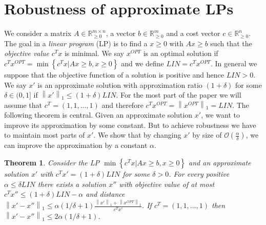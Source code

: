 \documentclass[a4paper,11pt]{article}
\newcommand{\menge}[1]{\left\{#1\right\}}
\newcommand{\nor}[1]{\left\|#1\right\|}
\newtheorem{thm}{Theorem}
\begin{document}
\section{Robustness of approximate LPs}
We consider a matrix $A \in \mathbb{R}_{\geq 0}^{m\times n}$, a vector $b \in \mathbb{R}_{\geq0}^{m}$ and a cost vector
$c\in \mathbb{R}_{\geq0}^{n}$.
The goal in a \emph{linear program} (LP) is to find a $x\geq0$ with $Ax \geq b$ such that the
\emph{objective value} $c^T x$ is minimal.
We say $x^\mathit{OPT}$ is an optimal solution if $c^T x^\mathit{OPT} = \min \menge{c^T x | Ax \geq b, x \geq 0 }$ 
and we define $\mathit{LIN} = c^T x^\mathit{OPT}$. In general we suppose that the objective function of a solution
is positive and hence $\mathit{LIN} >0$.
We say $x'$ is an approximate solution with approximation ratio $(1+\delta)$ for some 
$\delta \in (0,1]$ if $\nor{x'}_1 \leq (1+\delta)\mathit{LIN}$. For the most part of the paper we will assume that
$c^T = (1,1, \ldots ,1)$ and therefore $c^T x^{\mathit{OPT}} = \nor{x^{\mathit{OPT}}}_1 = \mathit{LIN}$.
The following theorem is central. Given an approximate solution $x'$, we want to improve its
approximation by some constant. But to achieve robustness we have to maintain most
parts of $x'$. We show that by changing $x'$ by size of $\mathcal{O}(\frac{\alpha}{\delta})$, 
we can improve the approximation by a constant $\alpha$.
\begin{thm}
  \label{thm1}
  Consider the LP $\min \menge{c^T x | Ax \geq b, x
  \geq 0 }$ and an approximate solution $x'$ with $c^T x'
  = (1 + \delta) \mathit{LIN}$ for some $\delta >0$.  For every positive $\alpha \leq \delta \mathit{LIN}$ there 
  exists a solution $x''$ with objective value of at most $c^T x'' \leq (1 +
  \delta) \mathit{LIN}- \alpha$ and distance $\nor{x' - x''}_1 \leq \alpha (1/ \delta +
  1) \frac{\nor{x'}_1+ \nor{x^{\mathit{OPT}}}_1}{c^T x'}$.
  If $c^T = (1,1, \ldots ,1)$ then $\nor{x' - x''}_1 \leq 2 \alpha (1/ \delta + 1)$.
\end{thm}
\end{document}
